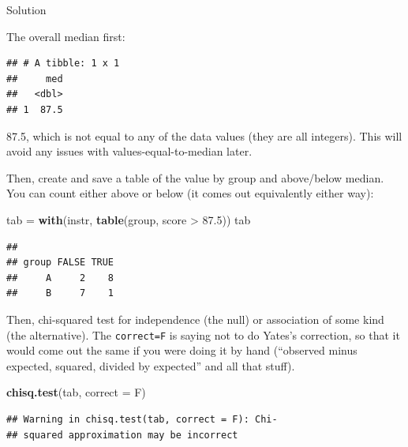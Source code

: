 \documentclass[]{tufte-book}
\newenvironment{Shaded}{}{}
\newcommand{\DataTypeTok}[1]{\textcolor[rgb]{0.56,0.13,0.00}{#1}}
\newcommand{\FloatTok}[1]{\textcolor[rgb]{0.25,0.63,0.44}{#1}}
\newcommand{\KeywordTok}[1]{\textcolor[rgb]{0.00,0.44,0.13}{\textbf{#1}}}
\newcommand{\NormalTok}[1]{#1}
\newcommand{\OperatorTok}[1]{\textcolor[rgb]{0.40,0.40,0.40}{#1}}
\newcommand{\StringTok}[1]{\textcolor[rgb]{0.25,0.44,0.63}{#1}}
\theoremstyle{definition}
\theoremstyle{definition}
\theoremstyle{definition}
\theoremstyle{remark}
\begin{document}
Solution

The overall median first:

\begin{Shaded}
\end{Shaded}

\begin{verbatim}
## # A tibble: 1 x 1
##     med
##   <dbl>
## 1  87.5
\end{verbatim}

87.5, which is not equal to any of the data values (they are all
integers). This will avoid any issues with values-equal-to-median later.

Then, create and save a table of the value by group and above/below
median. You can count either above or below (it comes out equivalently
either way):

\begin{Shaded}
\begin{Highlighting}[]
\NormalTok{tab =}\StringTok{ }\KeywordTok{with}\NormalTok{(instr, }\KeywordTok{table}\NormalTok{(group, score }\OperatorTok{>}\StringTok{ }\FloatTok{87.5}\NormalTok{))}
\NormalTok{tab}
\end{Highlighting}
\end{Shaded}

\begin{verbatim}
##      
## group FALSE TRUE
##     A     2    8
##     B     7    1
\end{verbatim}

Then, chi-squared test for independence (the null) or association of
some kind (the alternative). The \texttt{correct=F} is saying not to do
Yates's correction, so that it would come out the same if you were doing
it by hand (``observed minus expected, squared, divided by expected''
and all that stuff).

\begin{Shaded}
\begin{Highlighting}[]
\KeywordTok{chisq.test}\NormalTok{(tab, }\DataTypeTok{correct =}\NormalTok{ F)}
\end{Highlighting}
\end{Shaded}

\begin{verbatim}
## Warning in chisq.test(tab, correct = F): Chi-
## squared approximation may be incorrect
\end{verbatim}
\end{document}
